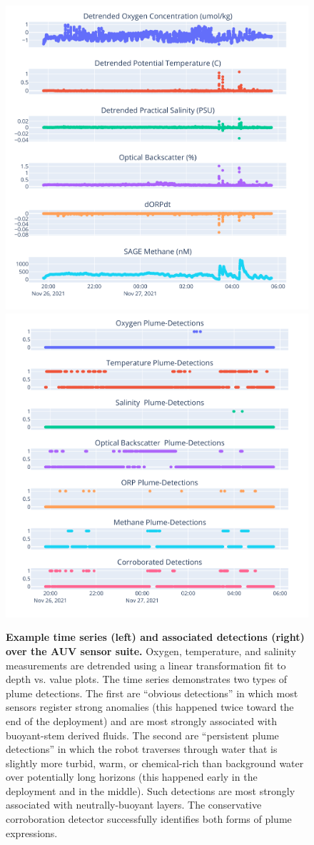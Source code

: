 \begin{figure}
    \centering
    \includegraphics[width=0.5\hsize]{figures/binary_example_time.png}
    \hspace{.05in}
    \includegraphics[width=0.5\hsize]{figures/binary_example_detections.png}
    \caption[Example time series (left) and associated detections (right) over the AUV \Sentry sensor suite.]{\textbf{Example time series (left) and associated detections (right) over the AUV \Sentry sensor suite.} Oxygen, temperature, and salinity measurements are detrended using a linear transformation fit to depth vs. value plots. The time series demonstrates two types of plume detections. The first are ``obvious detections'' in which most sensors register strong anomalies (this happened twice toward the end of the deployment) and are most strongly associated with buoyant-stem derived fluids. The second are ``persistent plume detections'' in which the robot traverses through water that is slightly more turbid, warm, or chemical-rich than background water over potentially long horizons (this happened early in the deployment and in the middle). Such detections are most strongly associated with neutrally-buoyant layers. The conservative corroboration detector successfully identifies both forms of plume expressions.}
    \label{fig:detection_example}
\end{figure}

